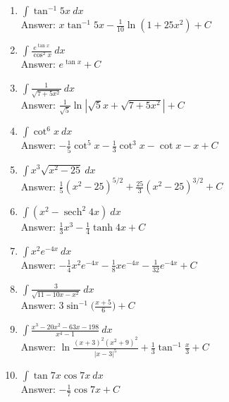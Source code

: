 \documentclass[11pt]{report}
\newcommand{\ds}{\displaystyle}
\DeclareMathOperator{\sech}{sech}
\begin{document}
\begin{enumerate}
\item $\ds \int \tan^{-1} 5x~dx$\\
Answer: $\ds x \tan^{-1} 5x -\frac{1}{10}\ln (1+25x^2) +C$\\

\item $\ds \int\frac{e^{\tan x}}{\cos ^2 x}~dx$\\
Answer: $\ds e^{\tan x} + C$\\

\item $\ds \int \frac{1}{\sqrt{7+5x^2}}~dx$\\
Answer: $\ds \frac{1}{\sqrt 5}\ln |\sqrt 5 x + \sqrt {7+5x^2}|+C$\\

\item $\ds \int \cot^6 x~dx$\\
Answer: $\ds -\frac{1}{5} \cot^5 x -\frac{1}{3} \cot^3 x - \cot x - x +C$\\

\item $\ds \int x^3\sqrt{x^2-25}~dx$\\
Answer: $\ds \frac{1}{5}(x^2-25)^{5/2} + \frac{25}{3}(x^2-25)^{3/2} +C$\\

\item $\ds \int (x^2 - \sech^2 4x)~dx$\\
Answer: $\ds \frac{1}{3} x^3 -\frac{1}{4} \tanh 4x +C$\\

\item $\ds \int x^2 e^{-4x} ~dx$\\
Answer: $\ds -\frac{1}{4} x^2 e^{-4x} -\frac{1}{8} xe^{-4x} -\frac{1}{32} e^{-4x}+C$\\

\item $\ds \int \frac{3}{\sqrt{11-10x-x^2}}~dx$\\
Answer: $\ds 3\sin^{-1} \bigl(\frac{x+5}{6}\bigr)+C$\\

\item $\ds \int \frac{x^3-20x^2-63x-198}{x^4-1}~dx$\\
Answer: $\ds  \ln \frac{(x+3)^2(x^2+9)^2}{|x-3|^5} +\frac{1}{3} \tan^{-1} \frac{x}{3}+C$\\

\item $\ds \int \tan 7x \cos 7x~dx$\\
Answer: $\ds -\frac{1}{7} \cos 7x +C$\\


\end{enumerate}
\end{document}
